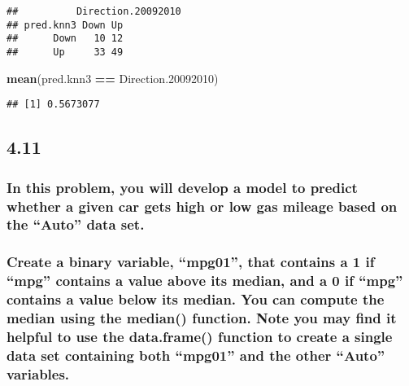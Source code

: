 \documentclass[]{article}
\newenvironment{Shaded}{\begin{snugshade}}{\end{snugshade}}
\newcommand{\KeywordTok}[1]{\textcolor[rgb]{0.13,0.29,0.53}{\textbf{#1}}}
\newcommand{\DecValTok}[1]{\textcolor[rgb]{0.00,0.00,0.81}{#1}}
\newcommand{\StringTok}[1]{\textcolor[rgb]{0.31,0.60,0.02}{#1}}
\newcommand{\OperatorTok}[1]{\textcolor[rgb]{0.81,0.36,0.00}{\textbf{#1}}}
\newcommand{\NormalTok}[1]{#1}
\begin{document}
\begin{verbatim}
##          Direction.20092010
## pred.knn3 Down Up
##      Down   10 12
##      Up     33 49
\end{verbatim}

\begin{Shaded}
\begin{Highlighting}[]
\KeywordTok{mean}\NormalTok{(pred.knn3 }\OperatorTok{==}\StringTok{ }\NormalTok{Direction.}\DecValTok{20092010}\NormalTok{)}
\end{Highlighting}
\end{Shaded}

\begin{verbatim}
## [1] 0.5673077
\end{verbatim}

\subsection{4.11}\label{section}

\subsubsection{\texorpdfstring{In this problem, you will develop a model
to predict whether a given car gets high or low gas mileage based on the
``Auto'' data
set.}{In this problem, you will develop a model to predict whether a given car gets high or low gas mileage based on the Auto data set.}}\label{in-this-problem-you-will-develop-a-model-to-predict-whether-a-given-car-gets-high-or-low-gas-mileage-based-on-the-auto-data-set.}

\subsubsection{\texorpdfstring{Create a binary variable, ``mpg01'', that
contains a 1 if ``mpg'' contains a value above its median, and a 0 if
``mpg'' contains a value below its median. You can compute the median
using the median() function. Note you may find it helpful to use the
data.frame() function to create a single data set containing both
``mpg01'' and the other ``Auto''
variables.}{Create a binary variable, mpg01, that contains a 1 if mpg contains a value above its median, and a 0 if mpg contains a value below its median. You can compute the median using the median() function. Note you may find it helpful to use the data.frame() function to create a single data set containing both mpg01 and the other Auto variables.}}\label{create-a-binary-variable-mpg01-that-contains-a-1-if-mpg-contains-a-value-above-its-median-and-a-0-if-mpg-contains-a-value-below-its-median.-you-can-compute-the-median-using-the-median-function.-note-you-may-find-it-helpful-to-use-the-data.frame-function-to-create-a-single-data-set-containing-both-mpg01-and-the-other-auto-variables.}
\end{document}
